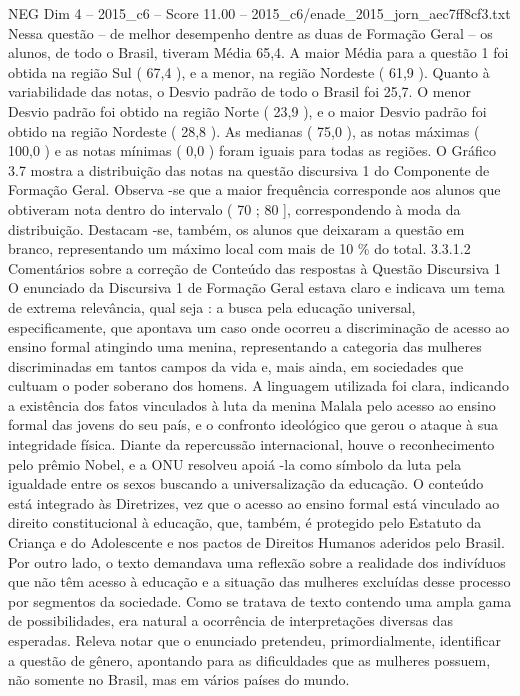\begin{textsample}{NEG Dim 4 – 2015\_c6 – Score 11.00 – 2015\_c6/enade\_2015\_jorn\_aec7ff8cf3.txt}
Nessa questão – de melhor desempenho dentre as duas de Formação Geral – os alunos, de todo o Brasil, tiveram Média 65,4.
A maior Média para a questão 1 foi obtida na região Sul ( 67,4 ), e a menor, na região Nordeste ( 61,9 ).
Quanto à variabilidade das notas, o Desvio padrão de todo o Brasil foi 25,7.
O menor Desvio padrão foi obtido na região Norte ( 23,9 ), e o maior Desvio padrão foi obtido na região Nordeste ( 28,8 ).
As medianas ( 75,0 ), as notas máximas ( 100,0 ) e as notas mínimas ( 0,0 ) foram iguais para todas as regiões.
O Gráfico 3.7 mostra a distribuição das notas na questão discursiva 1 do Componente de Formação Geral.
Observa -se que a maior frequência corresponde aos alunos que obtiveram nota dentro do intervalo ( 70 ; 80 ], correspondendo à moda da distribuição.
Destacam -se, também, os alunos que deixaram a questão em branco, representando um máximo local com mais de 10 \% do total. 3.3.1.2 Comentários sobre a correção de Conteúdo das respostas à Questão Discursiva 1 O enunciado da Discursiva 1 de Formação Geral estava claro e indicava um tema de extrema relevância, qual seja : a busca pela educação universal, especificamente, que apontava um caso onde ocorreu a discriminação de acesso ao ensino formal atingindo uma menina, representando a categoria das mulheres discriminadas em tantos campos da vida e, mais ainda, em sociedades que cultuam o poder soberano dos homens.
A linguagem utilizada foi clara, indicando a existência dos fatos vinculados à luta da menina Malala pelo acesso ao ensino formal das jovens do seu país, e o confronto ideológico que gerou o ataque à sua integridade física.
Diante da repercussão internacional, houve o reconhecimento pelo prêmio Nobel, e a ONU resolveu apoiá -la como símbolo da luta pela igualdade entre os sexos buscando a universalização da educação.
O conteúdo está integrado às Diretrizes, vez que o acesso ao ensino formal está vinculado ao direito constitucional à educação, que, também, é protegido pelo Estatuto da Criança e do Adolescente e nos pactos de Direitos Humanos aderidos pelo Brasil.
Por outro lado, o texto demandava uma reflexão sobre a realidade dos indivíduos que não têm acesso à educação e a situação das mulheres excluídas desse processo por segmentos da sociedade.
Como se tratava de texto contendo uma ampla gama de possibilidades, era natural a ocorrência de interpretações diversas das esperadas.
Releva notar que o enunciado pretendeu, primordialmente, identificar a questão de gênero, apontando para as dificuldades que as mulheres possuem, não somente no Brasil, mas em vários países do mundo.

\end{textsample}
